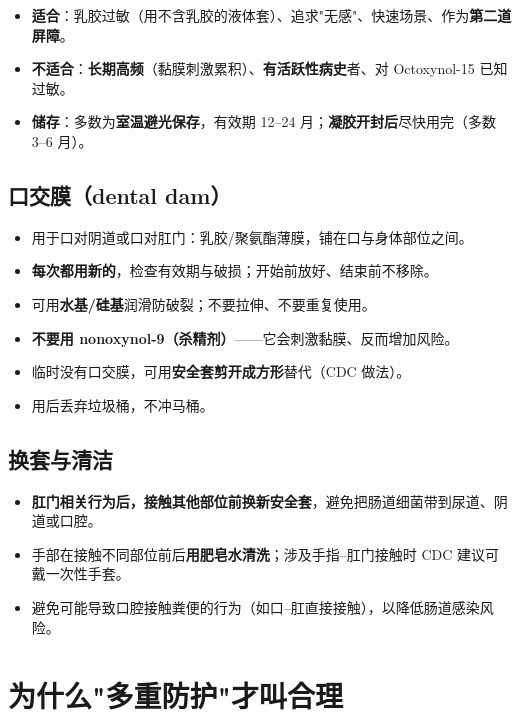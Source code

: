 \documentclass[12pt,UTF8,openany]{ctexbook}
\begin{document}
\begin{itemize}[leftmargin=2em,itemsep=0.3em]
  \item \textbf{适合}：乳胶过敏（用不含乳胶的液体套）、追求"无感"、快速场景、作为\textbf{第二道屏障}。
  \item \textbf{不适合}：\textbf{长期高频}（黏膜刺激累积）、\textbf{有活跃性病史}者、对 Octoxynol-15 已知过敏。
  \item \textbf{储存}：多数为\textbf{室温避光保存}，有效期 12--24 月；\textbf{凝胶开封后}尽快用完（多数 3--6 月）。
\end{itemize}

\subsection*{口交膜（dental dam）}

\begin{itemize}[leftmargin=2em]
  \item 用于口对阴道或口对肛门：乳胶/聚氨酯薄膜，铺在口与身体部位之间。
  \item \textbf{每次都用新的}，检查有效期与破损；开始前放好、结束前不移除。
  \item 可用\textbf{水基/硅基}润滑防破裂；不要拉伸、不要重复使用。
  \item \textbf{不要用 nonoxynol-9（杀精剂）}——它会刺激黏膜、反而增加风险。
  \item 临时没有口交膜，可用\textbf{安全套剪开成方形}替代（CDC 做法）。
  \item 用后丢弃垃圾桶，不冲马桶。
\end{itemize}

\subsection*{换套与清洁}

\begin{itemize}[leftmargin=2em]
  \item \textbf{肛门相关行为后，接触其他部位前换新安全套}，避免把肠道细菌带到尿道、阴道或口腔。
  \item 手部在接触不同部位前后\textbf{用肥皂水清洗}；涉及手指--肛门接触时 CDC 建议可戴一次性手套。
  \item 避免可能导致口腔接触粪便的行为（如口--肛直接接触），以降低肠道感染风险。
\end{itemize}

\section{为什么"多重防护"才叫合理}
\end{document}

